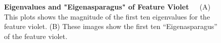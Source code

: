 \begin{figure}
    \centering
    \qquad
    \caption[First ten Eigenvalues and "Eigenasparagus" of Feature Violet]{\textbf{Eigenvalues and "Eigenasparagus" of Feature Violet}~~~(A) This plots shows the magnitude of the first ten eigenvalues for the feature violet. (B) These images show the first ten “Eigenasparagus” of the feature violet.}
    \label{fig:PCAviolet}
\end{figure}

